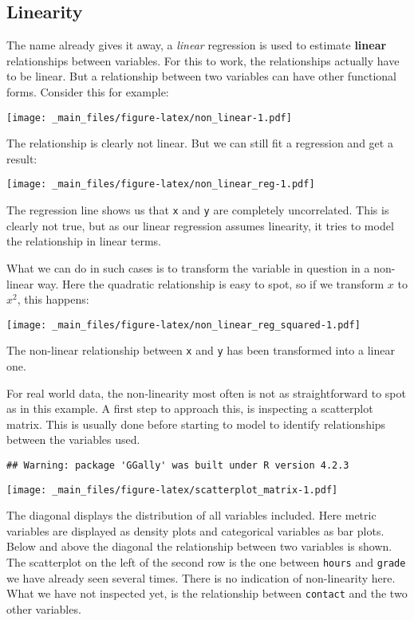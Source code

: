 \documentclass[
]{book}
\begin{document}
\hypertarget{linearity}{%
\subsection{Linearity}\label{linearity}}

The name already gives it away, a \emph{linear} regression is used to estimate
\textbf{linear} relationships between variables. For this to work, the relationships
actually have to be linear. But a relationship between two variables can have
other functional forms. Consider this for example:

\texttt{[image: \_main\_files/figure-latex/non\_linear-1.pdf]}

The relationship is clearly not linear. But we can still fit a regression and
get a result:

\texttt{[image: \_main\_files/figure-latex/non\_linear\_reg-1.pdf]}

The regression line shows us that \texttt{x} and \texttt{y} are completely uncorrelated. This
is clearly not true, but as our linear regression assumes linearity, it tries to
model the relationship in linear terms.

What we can do in such cases is to transform the variable in question in a
non-linear way. Here the quadratic relationship is easy to spot, so if we
transform \(x\) to \(x^2\), this happens:

\texttt{[image: \_main\_files/figure-latex/non\_linear\_reg\_squared-1.pdf]}

The non-linear relationship between \texttt{x} and \texttt{y} has been transformed into a
linear one.

For real world data, the non-linearity most often is not as straightforward to
spot as in this example. A first step to approach this, is inspecting a
scatterplot matrix. This is usually done before starting to model to identify
relationships between the variables used.

\begin{verbatim}
## Warning: package 'GGally' was built under R version 4.2.3
\end{verbatim}

\texttt{[image: \_main\_files/figure-latex/scatterplot\_matrix-1.pdf]}

The diagonal displays the distribution of all variables included. Here metric
variables are displayed as density plots and categorical variables as bar plots.
Below and above the diagonal the relationship between two variables is shown.
The scatterplot on the left of the second row is the one between \texttt{hours} and
\texttt{grade} we have already seen several times. There is no indication of
non-linearity here. What we have not inspected yet, is the relationship
between \texttt{contact} and the two other variables.
\end{document}
